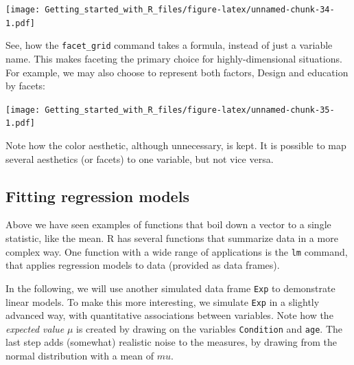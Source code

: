 \documentclass[]{svmono}
\newenvironment{Shaded}{\begin{snugshade}}{\end{snugshade}}
\newcommand{\KeywordTok}[1]{\textcolor[rgb]{0.13,0.29,0.53}{\textbf{#1}}}
\newcommand{\DataTypeTok}[1]{\textcolor[rgb]{0.13,0.29,0.53}{#1}}
\newcommand{\StringTok}[1]{\textcolor[rgb]{0.31,0.60,0.02}{#1}}
\newcommand{\OperatorTok}[1]{\textcolor[rgb]{0.81,0.36,0.00}{\textbf{#1}}}
\newcommand{\NormalTok}[1]{#1}
\theoremstyle{definition}
\theoremstyle{definition}
\theoremstyle{definition}
\theoremstyle{remark}
\begin{document}
\texttt{[image: Getting\_started\_with\_R\_files/figure-latex/unnamed-chunk-34-1.pdf]}

See, how the \texttt{facet\_grid} command takes a formula, instead of
just a variable name. This makes faceting the primary choice for
highly-dimensional situations. For example, we may also choose to
represent both factors, Design and education by facets:

\begin{Shaded}
\end{Shaded}

\texttt{[image: Getting\_started\_with\_R\_files/figure-latex/unnamed-chunk-35-1.pdf]}

Note how the color aesthetic, although unnecessary, is kept. It is
possible to map several aesthetics (or facets) to one variable, but not
vice versa.

\subsection{Fitting regression models}\label{fitting-regression-models}

Above we have seen examples of functions that boil down a vector to a
single statistic, like the mean. R has several functions that summarize
data in a more complex way. One function with a wide range of
applications is the \texttt{lm} command, that applies regression models
to data (provided as data frames).

In the following, we will use another simulated data frame \texttt{Exp}
to demonstrate linear models. To make this more interesting, we simulate
\texttt{Exp} in a slightly advanced way, with quantitative associations
between variables. Note how the \emph{expected value} \(\mu\) is created
by drawing on the variables \texttt{Condition} and \texttt{age}. The
last step adds (somewhat) realistic noise to the measures, by drawing
from the normal distribution with a mean of \(mu\).
\end{document}

